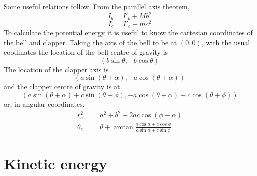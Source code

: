 \documentclass{article}
\begin{document}
Some useful relations follow.  From the parallel axis theorem, 
\begin{equation}
I_b = I'_b + M b^2
\end{equation}
\begin{equation}
I_c = I'_c + m c^2
\end{equation}
To calculate the potential energy it is useful to know the cartesian coordinates of the
bell and clapper. Taking the axis of the bell to be at $(0,0)$, with the usual coodinates the
location of the bell centre of gravity is
\begin{equation}
(b \sin \theta, -b \cos \theta)
\end{equation}
The location of the clapper axis is
\begin{equation}
(a \sin(\theta+\alpha), -a \cos(\theta+\alpha))
\end{equation}
and the clapper centre of gravity is at
\begin{equation}
(a \sin(\theta+\alpha) + c \sin(\theta+\phi), -a \cos(\theta+\alpha) - c \cos(\theta+\phi))
\end{equation}
or, in angular coordinates,
\begin{equation}
\begin{array}{rcl}
r_c^2 &=& a^2 + b^2 + 2ac \cos(\phi - \alpha) \\
\theta_c &=& \theta + \arctan \frac{a \cos \alpha + c \cos \phi}{a \sin \alpha + c \sin \phi}
\end{array}
\end{equation}

\section{Kinetic energy}
\end{document}
